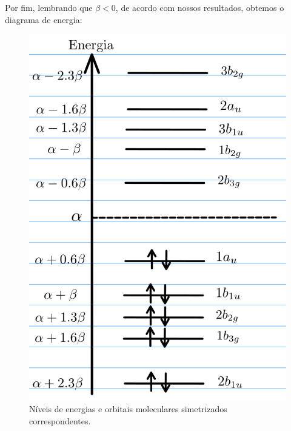 \documentclass[a4paper,10pt]{article}
\begin{document}
\normalsize

Por fim, lembrando que $\beta < 0$, de acordo com nossos resultados, obtemos o diagrama de energia:
\begin{figure}[H]
\centering
\includegraphics[width=0.6\linewidth]{fig/diagrama_energia.png}
\caption{Níveis de energias e orbitais moleculares simetrizados correspondentes.}
\label{fig:diagrama_energia}
\end{figure}
\end{document}
